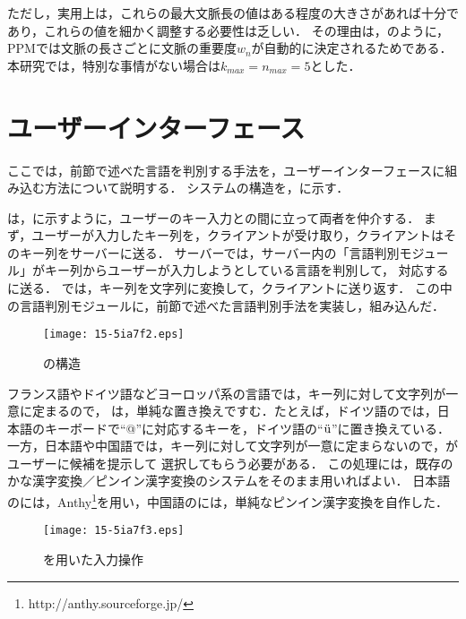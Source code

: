 \documentclass[japanese]{jnlp_1.4}
\newcommand{\name}{}
\newcommand{\figref}[1]{}
\renewcommand{\eqref}[1]{}
\newcommand{\tes}{}
\begin{document}
ただし，実用上は，これらの最大文脈長の値はある程度の大きさがあれば十分であり，これらの値を細かく調整する必要性は乏しい．
その理由は，\eqref{eq:weights}のように，PPMでは文脈の長さごとに文脈の重要度$w_n$が自動的に決定されるためである．
本研究では，特別な事情がない場合は$k_{max}=n_{max}=5$とした．






\section{ユーザーインターフェース} 
\label{sec:design}

ここでは，前節で述べた言語を判別する手法を，ユーザーインターフェースに組み込む方法について説明する．
システムの構造を，\figref{fig:systemstructure}に示す．

{\name}は，\figref{fig:systemstructure}に示すように，ユーザーのキー入力と{\tes}の間に立って両者を仲介する．
まず，ユーザーが入力したキー列を，クライアントが受け取り，クライアントはそのキー列をサーバーに送る．
サーバーでは，サーバー内の「言語判別モジュール」がキー列からユーザーが入力しようとしている言語を判別して，
対応する{\tes}に送る．
{\tes}では，キー列を文字列に変換して，クライアントに送り返す．
この中の言語判別モジュールに，前節で述べた言語判別手法を実装し，組み込んだ．


\begin{figure}[b] 
  \begin{center}
\vspace{-0.5\baselineskip}
\texttt{[image: 15-5ia7f2.eps]}
        \caption{{\name}の構造} 
        \label{fig:systemstructure} 
      \end{center}
\end{figure}

フランス語やドイツ語などヨーロッパ系の言語では，キー列に対して文字列が一意に定まるので，
{\tes}は，単純な置き換えですむ．たとえば，ドイツ語の{\tes}では，日本語のキーボードで``@''に対応するキーを，ドイツ語の``$\rm{\ddot{u}}$''に置き換えている．
一方，日本語や中国語では，キー列に対して文字列が一意に定まらないので，{\tes}がユーザーに候補を提示して
選択してもらう必要がある．
この処理には，既存のかな漢字変換／ピンイン漢字変換のシステムをそのまま用いればよい．
日本語の{\tes}には，Anthy\footnote{http://anthy.sourceforge.jp/}を用い，中国語の{\tes}には，単純なピンイン漢字変換を自作した．

\begin{figure}[b] 
  \begin{center}
\texttt{[image: 15-5ia7f3.eps]}
    \caption{{\name}を用いた入力操作} 
    \label{fig:entryflow} 
  \end{center}
\vspace{-1.5\baselineskip}
\end{figure}
\end{document}
